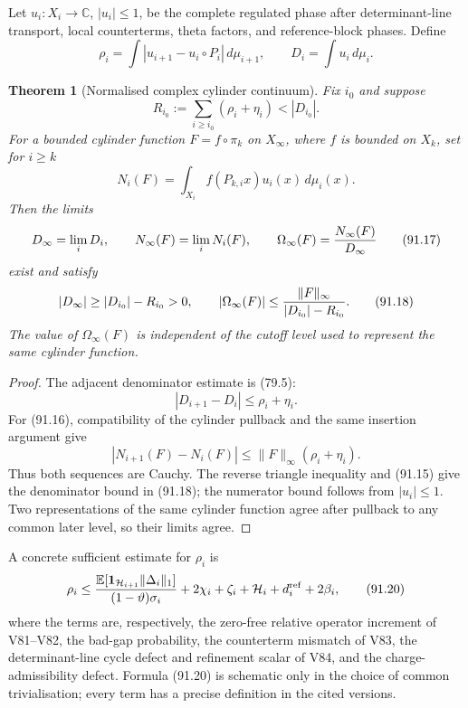 \documentclass[11pt]{article}
\newtheorem{theorem}{Theorem}[section]
\begin{document}
Let \(u_i:X_i\to\mathbb C\), \(|u_i|\le1\), be the complete regulated
phase after determinant-line transport, local counterterms, theta
factors, and reference-block phases.  Define
\[
 \rho_i=\int|u_{i+1}-u_i\circ P_i|\,d\mu_{i+1},\qquad
 D_i=\int u_i\,d\mu_i.                                      \tag{91.14}
\]

\begin{theorem}[Normalised complex cylinder continuum]
\label{thm:v11v91-complex}
Fix \(i_0\) and suppose
\[
 R_{i_0}:=\sum_{i\ge i_0}(\rho_i+\eta_i)<|D_{i_0}|.          \tag{91.15}
\]
For a bounded cylinder function
\(F=f\circ\pi_k\) on \(X_\infty\), where \(f\) is bounded on \(X_k\),
set for \(i\ge k\)
\[
 N_i(F)=\int_{X_i}f(P_{k,i}x)u_i(x)\,d\mu_i(x).              \tag{91.16}
\]
Then the limits
\[
 D_\infty=\lim_iD_i,\qquad
 N_\infty(F)=\lim_iN_i(F),\qquad
 \Omega_\infty(F)={N_\infty(F)\over D_\infty}               \tag{91.17}
\]
exist and satisfy
\[
 |D_\infty|\ge|D_{i_0}|-R_{i_0}>0,\qquad
 |\Omega_\infty(F)|
 \le{\|F\|_\infty\over|D_{i_0}|-R_{i_0}}.                   \tag{91.18}
\]
The value of \(\Omega_\infty(F)\) is independent of the cutoff level
used to represent the same cylinder function.
\end{theorem}

\begin{proof}
The adjacent denominator estimate is (79.5):
\[
                              |D_{i+1}-D_i|\le\rho_i+\eta_i.
\]
For (91.16), compatibility of the cylinder pullback and the same
insertion argument give
\[
 |N_{i+1}(F)-N_i(F)|
       \le\|F\|_\infty(\rho_i+\eta_i).                       \tag{91.19}
\]
Thus both sequences are Cauchy.  The reverse triangle inequality and
(91.15) give the denominator bound in (91.18); the numerator bound
follows from \(|u_i|\le1\).  Two representations of the same cylinder
function agree after pullback to any common later level, so their
limits agree.
\end{proof}

A concrete sufficient estimate for \(\rho_i\) is
\[
 \rho_i\le
 { {\mathbb E}[{\bf1}_{{\cal H}_{i+1}}\|\Delta_i\|_1]
       \over(1-\vartheta)\sigma_i}
 +2\chi_i+\zeta_i+{\cal H}_i+d_i^{\rm ref}
 +2\beta_i,                                                  \tag{91.20}
\]
where the terms are, respectively, the zero-free relative operator
increment of V81--V82, the bad-gap probability, the counterterm
mismatch of V83, the determinant-line cycle defect and refinement
scalar of V84, and the charge-admissibility defect.  Formula (91.20)
is schematic only in the choice of common trivialisation; every term
has a precise definition in the cited versions.
\end{document}
